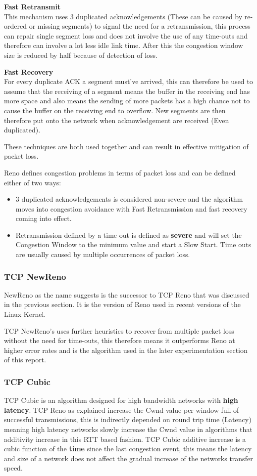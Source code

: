 {\bf Fast Retransmit}\\
This mechanism uses 3 duplicated acknowledgements (These can be caused by re-ordered or missing segments) to signal the need for a retransmission, this process can repair single segment loss and does not involve the use of any time-outs and therefore can involve a lot less idle link time. After this the congestion window size is reduced by half because of detection of loss.

{\bf Fast Recovery}\\
For every duplicate ACK a segment must've arrived, this can therefore be used to assume that the receiving of a segment means the buffer in the receiving end has more space and also means the sending of more packets has a high chance not to cause the buffer on the receiving end to overflow. New segments are then therefore put onto the network when acknowledgement are received (Even duplicated). 

These techniques are both used together and can result in effective mitigation of packet loss.

Reno defines congestion problems in terms of packet loss and can be defined either of two ways:

\begin{itemize}
	\item 3 duplicated acknowledgements is considered non-severe and the algorithm moves into congestion avoidance with Fast Retransmission and fast recovery coming into effect.
	\item Retransmission defined by a time out is defined as {\bf severe} and will set the Congestion Window to the minimum value and start a Slow Start. Time outs are usually caused by multiple occurrences of packet loss.
\end{itemize}

\subsubsection*{TCP NewReno}
NewReno \citep{newReno} as the name suggests is the successor to TCP Reno that was discussed in the previous section. It is the version of Reno used in recent versions of the Linux Kernel.

TCP NewReno's uses further heuristics to recover from multiple packet loss without the need for time-outs, this therefore means it outperforms Reno at higher error rates and is the algorithm used in the later experimentation section of this report.


\subsubsection*{TCP Cubic}
TCP Cubic is an algorithm designed for high bandwidth networks with {\bf high latency}. TCP Reno as explained increase the Cwnd value per window full of successful transmissions, this is indirectly depended on round trip time (Latency) meaning high latency networks slowly increase the Cwnd value in algorithms that additivity increase in this RTT based fashion. TCP Cubic additive increase is a cubic function of the {\bf time} since the last congestion event, this means the latency and size of a network does not affect the gradual increase of the networks transfer speed.

